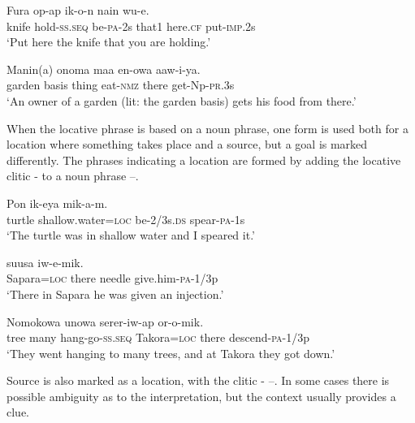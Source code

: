 \ea%
\label{ex:4:x871}
\gll Fura  op-ap  ik-o-n  nain    wu-e. \\
    knife  hold-\textsc{ss}.\textsc{seq}  be-\textsc{pa}-2s  that1  here.\textsc{cf}  put-\textsc{imp}.2s  \\
\glt`Put here the knife that you are holding.'
\z

\ea%
\label{ex:4:x1833}
\gll Manin(a)  onoma  maa  en-owa    aaw-i-ya. \\
    garden  basis  thing  eat-\textsc{nmz}  there  get-Np-\textsc{pr}.3s  \\
\glt`An owner of a garden (lit: the garden basis) gets his food from there.'
\z

When the locative phrase is based on a noun phrase, one form is used both for  a location where something takes place and a source, but a goal is marked differently.  The phrases indicating a location are formed by adding the locative clitic \nobreakdash-  to a noun phrase --.

\ea%
\label{ex:4:x856}
\gll Pon    ik-eya  mik-a-m. \\
     turtle  shallow.water=\textsc{loc}  be-2/3s.\textsc{ds}  spear-\textsc{pa}-1s \\
\glt`The turtle was in shallow water and I speared it.'
\z

\ea%
\label{ex:4:x857}
\gll {}   suusa  iw-e-mik. \\
   Sapara=\textsc{loc}  there  needle  give.him-\textsc{pa}-1/3p   \\
\glt`There in Sapara he was given an injection.'
\z

\ea%
\label{ex:4:x865}
\gll Nomokowa  unowa  serer-iw-ap    or-o-mik.\\
   tree  many  hang-go-\textsc{ss}.\textsc{seq}  Takora=\textsc{loc}  there  descend-\textsc{pa}-1/3p   \\
\glt`They went hanging to many trees, and at Takora they got down.'
\z

Source is also marked as a location, with the clitic - --. In some cases there is possible ambiguity as to the interpretation, but the context usually provides a clue.

